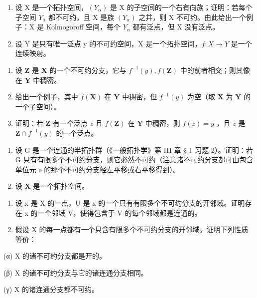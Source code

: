 \begin{enumerate}
\def\labelenumi{\arabic{enumi}.}
\setcounter{enumi}{2}
\item
  设 X 是一个拓扑空间，\((Y_{\alpha})\) 是 X 的子空间的一个右有向族；证明：若每个子空间 \(Y_{\alpha}\) 都不可约，且 X 是族 \((Y_{\alpha})\) 之并，则 X 不可约。由此给出一个例子：X 是 Kolmogoroff 空间，每个 \(Y_{\alpha}\) 都有泛点，但 X 没有泛点。
\item
  设 Y 是只有唯一泛点 y 的不可约空间，X 是一个拓扑空间，\(f: X \rightarrow Y\) 是一个连续映射。
\end{enumerate}

\begin{enumerate}
\def\labelenumi{(\alph{enumi})}
\item
  设 \(\mathbf{Z}\) 是 \(\mathbf{X}\) 的一个不可约分支，它与 \(f^{-1}(y), f(\mathbf{Z})\) 中的前者相交；则其像在 \(\mathbf{Y}\) 中稠密。
\item
  给出一个例子，其中 \(f(\mathbf{X})\) 在 \(\mathbf{Y}\) 中稠密，但 \(f^{-1}(y)\) 为空（取 \(\mathbf{X}\) 为 \(\mathbf{Y}\) 的一个子空间）。
\item
  证明：若 \(\mathbf{Z}\) 有一个泛点 \(z\) 且 \(f(\mathbf{Z})\) 在 \(\mathbf{Y}\) 中稠密，则 \(f(z) = y\) ，且 \(z\) 是 \(\mathbf{Z} \cap f^{-1}(y)\) 的一个泛点。
\end{enumerate}

\begin{enumerate}
\def\labelenumi{\arabic{enumi}.}
\setcounter{enumi}{4}
\item
  设 G 是一个连通的半拓扑群（《一般拓扑学》第 III 章 § 1 习题 2）。证明：若 G 只有有限多个不可约分支，则它必然不可约（注意诸不可约分支都可由包含单位元 e 的那个不可约分支经左平移或右平移得到）。
\item
  设 \(\mathbf{X}\) 是一个拓扑空间。
\end{enumerate}

\begin{enumerate}
\def\labelenumi{(\alph{enumi})}
\item
  设 x 是 X 的一点，U 是 x 的一个只有有限多个不可约分支的开邻域。证明存在 x 的一个邻域 V，使得包含于 V 的每个邻域都是连通的。
\item
  假设 X 的每一点都有一个只含有限多个不可约分支的开邻域。证明下列性质等价：
\end{enumerate}

(α) X 的诸不可约分支都是开的。

(β) X 的诸不可约分支与它的诸连通分支相同。

(γ) X 的诸连通分支都不可约。

